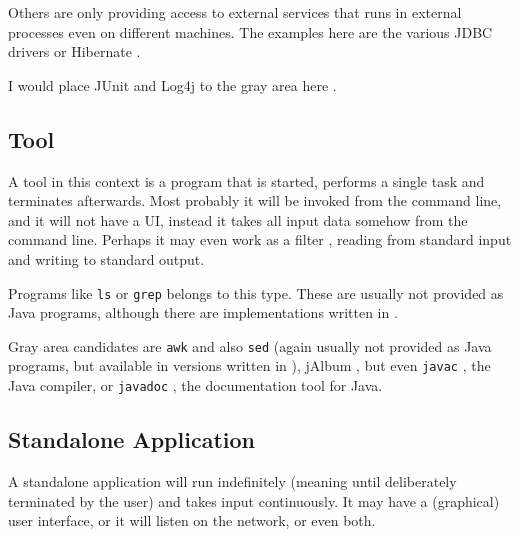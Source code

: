 Others are only providing access to external services that runs in external processes even on different machines. The examples here are the various JDBC drivers or Hibernate \autocite{HIBERNATE_ORM}.

I would place JUnit \autocite{JUNIT5} and Log4j \autocite{APACHE_LOG4J} to the gray area here .


\subsection{Tool}\label{sec:Tool}
A tool in this context is a program that is started, performs a single task and terminates afterwards. Most probably it will be invoked from the command line, and it will not have a UI, instead it takes all input data somehow from the command line. Perhaps it may even work as a filter \autocite{WIKIPEDIA:Filter}, reading from standard input and writing to standard output.

Programs like \texttt{ls} or \texttt{grep} belongs to this type. These are usually not provided as Java programs, although there are implementations written in \Java.

Gray area candidates are \texttt{awk} and also \texttt{sed} (again usually not provided as Java programs, but available in versions written in \Java), jAlbum \autocite{JALBUM}, but even \texttt{javac} \autocite{ORACLE_TOOL:javac}, the Java compiler, or \texttt{javadoc} \autocite{ORACLE_TOOL:javadoc}, the documentation tool for Java.


\subsection{Standalone Application}\label{sec:StandaloneApplication}
A standalone application will run indefinitely (meaning until deliberately terminated by the user) and takes input continuously. It may have a (graphical) user interface, or it will listen on the network, or even both.

